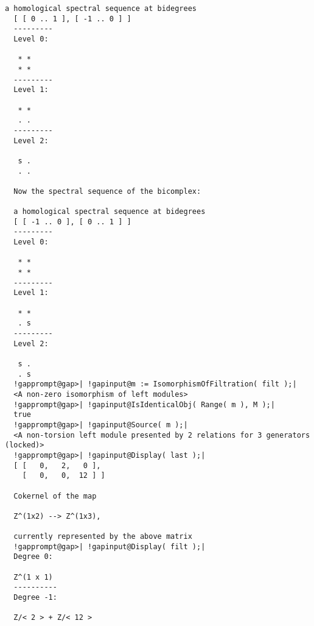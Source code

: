 \documentclass[a4paper,11pt]{report}
\begin{document}
{{\begin{Verbatim}[commandchars=!@|,fontsize=\small,frame=single,label=Example]
  a homological spectral sequence at bidegrees
  [ [ 0 .. 1 ], [ -1 .. 0 ] ]
  ---------
  Level 0:
  
   * *
   * *
  ---------
  Level 1:
  
   * *
   . .
  ---------
  Level 2:
  
   s .
   . .
  
  Now the spectral sequence of the bicomplex:
  
  a homological spectral sequence at bidegrees
  [ [ -1 .. 0 ], [ 0 .. 1 ] ]
  ---------
  Level 0:
  
   * *
   * *
  ---------
  Level 1:
  
   * *
   . s
  ---------
  Level 2:
  
   s .
   . s
  !gapprompt@gap>| !gapinput@m := IsomorphismOfFiltration( filt );|
  <A non-zero isomorphism of left modules>
  !gapprompt@gap>| !gapinput@IsIdenticalObj( Range( m ), M );|
  true
  !gapprompt@gap>| !gapinput@Source( m );|
  <A non-torsion left module presented by 2 relations for 3 generators (locked)>
  !gapprompt@gap>| !gapinput@Display( last );|
  [ [   0,   2,   0 ],
    [   0,   0,  12 ] ]
  
  Cokernel of the map
  
  Z^(1x2) --> Z^(1x3),
  
  currently represented by the above matrix
  !gapprompt@gap>| !gapinput@Display( filt );|
  Degree 0:
  
  Z^(1 x 1)
  ----------
  Degree -1:
  
  Z/< 2 > + Z/< 12 > 
\end{Verbatim}
 }

 
}
\end{document}
